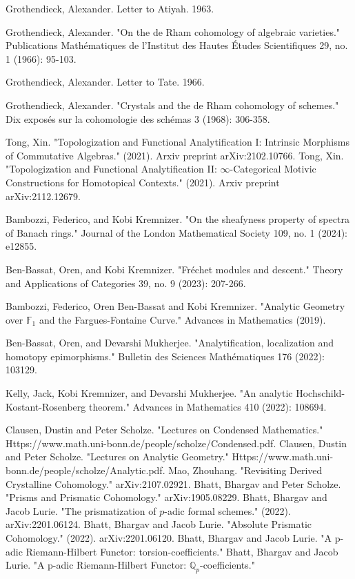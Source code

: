 \documentclass[12pt]{book}
\begin{document}
\begin{thebibliography}{}


 Grothendieck, Alexander. Letter to Atiyah. 1963.


 Grothendieck, Alexander. "On the de Rham cohomology of algebraic varieties." Publications Math\'ematiques de l'Institut des Hautes \'Etudes Scientifiques 29, no. 1 (1966): 95-103.

 Grothendieck, Alexander. Letter to Tate. 1966.


 Grothendieck, Alexander. "Crystals and the de Rham cohomology of schemes." Dix expos\'es sur la cohomologie des sch\'emas 3 (1968): 306-358.

 Tong, Xin. "Topologization and Functional Analytification I: Intrinsic Morphisms of Commutative Algebras." (2021). Arxiv preprint arXiv:2102.10766.
 Tong, Xin. "Topologization and Functional Analytification II: $\infty$-Categorical Motivic Constructions for Homotopical Contexts." (2021). Arxiv preprint arXiv:2112.12679.

 Bambozzi, Federico, and Kobi Kremnizer. "On the sheafyness property of spectra of Banach rings." Journal of the London Mathematical Society 109, no. 1 (2024): e12855.


 Ben-Bassat, Oren, and Kobi Kremnizer. "Fr\'echet modules and descent." Theory and Applications of Categories 39, no. 9 (2023): 207-266.

 Bambozzi, Federico, Oren Ben-Bassat and Kobi Kremnizer. "Analytic Geometry over $\mathbb{F}_1$ and the Fargues-Fontaine Curve." Advances in Mathematics (2019).

 Ben-Bassat, Oren, and Devarshi Mukherjee. "Analytification, localization and homotopy epimorphisms." Bulletin des Sciences Math\'ematiques 176 (2022): 103129.

 Kelly, Jack, Kobi Kremnizer, and Devarshi Mukherjee. "An analytic Hochschild-Kostant-Rosenberg theorem." Advances in Mathematics 410 (2022): 108694.

 Clausen, Dustin and Peter Scholze. "Lectures on Condensed Mathematics." Https://www.math.uni-bonn.de/people/scholze/Condensed.pdf.
 Clausen, Dustin and Peter Scholze. "Lectures on Analytic Geometry." Https://www.math.uni-bonn.de/people/scholze/Analytic.pdf.
  Mao, Zhouhang. "Revisiting Derived Crystalline Cohomology." arXiv:2107.02921.
 Bhatt, Bhargav and Peter Scholze. "Prisms and Prismatic Cohomology." arXiv:1905.08229.
 Bhatt, Bhargav and Jacob Lurie. "The prismatization of $p$-adic formal schemes." (2022). arXiv:2201.06124.
 Bhatt, Bhargav and Jacob Lurie. "Absolute Prismatic Cohomology." (2022). arXiv:2201.06120.
 Bhatt, Bhargav and Jacob Lurie. "A p-adic Riemann-Hilbert Functor: torsion-coefficients."
 Bhatt, Bhargav and Jacob Lurie. "A p-adic Riemann-Hilbert Functor: $\mathbb{Q}_p$-coefficients."


\end{thebibliography}
\end{document}
